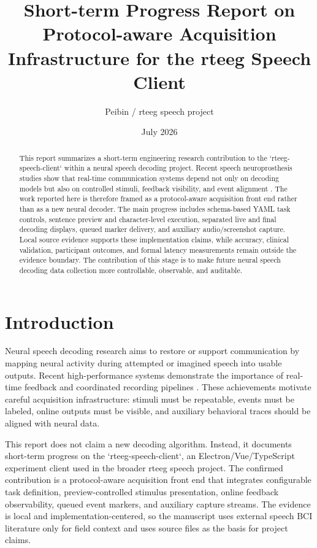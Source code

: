 \documentclass[11pt]{article}
\title{Short-term Progress Report on Protocol-aware Acquisition Infrastructure for the rteeg Speech Client}
\author{Peibin / rteeg speech project}
\date{July 2026}
\begin{document}
\maketitle

\begin{abstract}
This report summarizes a short-term engineering research contribution to the `rteeg-speech-client` within a neural speech decoding project. Recent speech neuroprosthesis studies show that real-time communication systems depend not only on decoding models but also on controlled stimuli, feedback visibility, and event alignment \cite{Metzger2023Nature,Willett2023Nature,Card2024NEJM}. The work reported here is therefore framed as a protocol-aware acquisition front end rather than as a new neural decoder. The main progress includes schema-based YAML task controls, sentence preview and character-level execution, separated live and final decoding displays, queued marker delivery, and auxiliary audio/screenshot capture. Local source evidence supports these implementation claims, while accuracy, clinical validation, participant outcomes, and formal latency measurements remain outside the evidence boundary. The contribution of this stage is to make future neural speech decoding data collection more controllable, observable, and auditable.
\end{abstract}

\section{Introduction}
Neural speech decoding research aims to restore or support communication by mapping neural activity during attempted or imagined speech into usable outputs. Recent high-performance systems demonstrate the importance of real-time feedback and coordinated recording pipelines \cite{Metzger2023Nature,Willett2023Nature}. These achievements motivate careful acquisition infrastructure: stimuli must be repeatable, events must be labeled, online outputs must be visible, and auxiliary behavioral traces should be aligned with neural data.

This report does not claim a new decoding algorithm. Instead, it documents short-term progress on the `rteeg-speech-client`, an Electron/Vue/TypeScript experiment client used in the broader rteeg speech project. The confirmed contribution is a protocol-aware acquisition front end that integrates configurable task definition, preview-controlled stimulus presentation, online feedback observability, queued event markers, and auxiliary capture streams. The evidence is local and implementation-centered, so the manuscript uses external speech BCI literature only for field context and uses source files as the basis for project claims.
\end{document}
